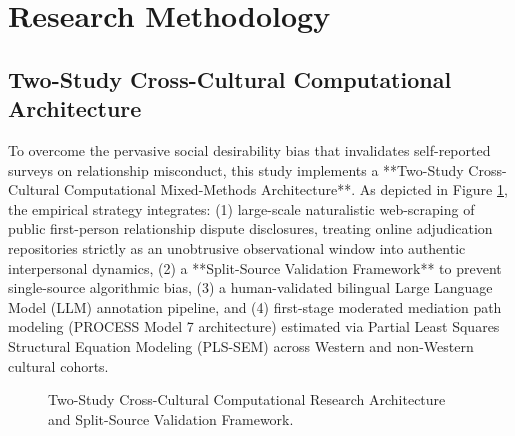 \section{Research Methodology}
\label{sec:methodology}

\subsection{Two-Study Cross-Cultural Computational Architecture}
To overcome the pervasive social desirability bias that invalidates self-reported surveys on relationship misconduct, this study implements a **Two-Study Cross-Cultural Computational Mixed-Methods Architecture**. As depicted in Figure \ref{fig:method_pipeline}, the empirical strategy integrates: (1) large-scale naturalistic web-scraping of public first-person relationship dispute disclosures, treating online adjudication repositories strictly as an unobtrusive observational window into authentic interpersonal dynamics, (2) a **Split-Source Validation Framework** to prevent single-source algorithmic bias, (3) a human-validated bilingual Large Language Model (LLM) annotation pipeline, and (4) first-stage moderated mediation path modeling (PROCESS Model 7 architecture) estimated via Partial Least Squares Structural Equation Modeling (PLS-SEM) across Western and non-Western cultural cohorts.

\begin{figure}[htbp]
\centering
{}
\caption{Two-Study Cross-Cultural Computational Research Architecture and Split-Source Validation Framework.}
\label{fig:method_pipeline}
\end{figure}

